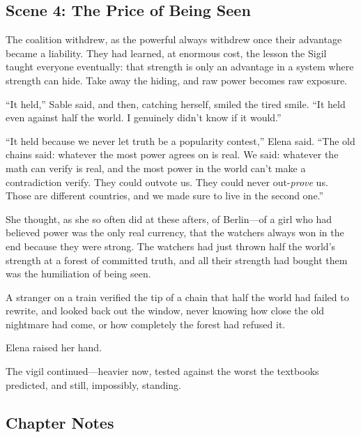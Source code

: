 \documentclass[12pt,letterpaper]{book}
\begin{document}
\hypertarget{scene-4-the-price-of-being-seen}{%
\subsection{Scene 4: The Price of Being
Seen}\label{scene-4-the-price-of-being-seen}}

The coalition withdrew, as the powerful always withdrew once their advantage became
a liability. They had learned, at enormous cost, the lesson the Sigil taught
everyone eventually: that strength is only an advantage in a system where strength
can hide. Take away the hiding, and raw power becomes raw exposure.

``It held,'' Sable said, and then, catching herself, smiled the tired smile.
``It held even against half the world. I genuinely didn't know if it would.''

``It held because we never let truth be a popularity contest,'' Elena said. ``The
old chains said: whatever the most power agrees on is real. We said: whatever the
math can verify is real, and the most power in the world can't make a contradiction
verify. They could outvote us. They could never out-\emph{prove} us. Those are
different countries, and we made sure to live in the second one.''

She thought, as she so often did at these afters, of Berlin---of a girl who had
believed power was the only real currency, that the watchers always won in the end
because they were strong. The watchers had just thrown half the world's strength at
a forest of committed truth, and all their strength had bought them was the
humiliation of being seen.

A stranger on a train verified the tip of a chain that half the world had failed to
rewrite, and looked back out the window, never knowing how close the old nightmare
had come, or how completely the forest had refused it.

Elena raised her hand.

The vigil continued---heavier now, tested against the worst the textbooks
predicted, and still, impossibly, standing.

\hypertarget{chapter-22-notes}{%
\subsection{Chapter Notes}\label{chapter-22-notes}}
\end{document}
